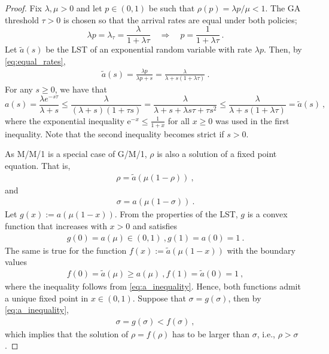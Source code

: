 \documentclass[10pt,a4paper]{amsart}
\def\e{\mathrm{e}}
\begin{document}
\begin{proof}
Fix $\lambda,\mu>0$ and let $p\in(0,1)$ be such that $\rho(p)=\lambda p/\mu<1$. The GA threshold $\tau> 0$ is chosen so that the arrival rates are equal under both policies;
\begin{equation}\label{eq:equal_rates}
    \lambda p=\lambda_\tau=\frac{\lambda}{1+\lambda\tau}\quad\Longrightarrow\quad
p=\frac{1}{1+\lambda\tau}\ .
\end{equation}
Let $\tilde a(s)$ be the LST of an exponential random variable with rate $\lambda p$. Then, by \eqref{eq:equal_rates},
\begin{align*}
\tilde a(s)=\frac{\lambda p}{\lambda p+s}=\frac{\lambda}{\lambda+s(1+\lambda\tau)} \ .
\end{align*}
For any $s\geq 0$, we have that
\begin{equation}\label{eq:a_inequality}
    a(s)=\frac{\lambda e^{-s\tau}}{\lambda+s}
\leq \frac{\lambda}{(\lambda+s)(1+\tau s)}=\frac{\lambda}{\lambda+s+\lambda s\tau+\tau s^2}
\leq \frac{\lambda}{\lambda+s(1+\lambda\tau)}= \tilde a(s)\ ,
\end{equation}
where the exponential inequality $\e^{-x}\leq \frac{1}{1+x}$ for all $x\geq 0$ was used in the first inequality. Note that the second inequality becomes strict if $s>0$.

As M/M/1 is a special case of G/M/1, $\rho$ is also a solution of a fixed point equation. That is,
\begin{align*}
    \rho=\tilde{a}(\mu(1-\rho))\ ,
\end{align*}
and 
\begin{align*}
    \sigma=a(\mu(1-\sigma))\ .
\end{align*}
Let $g(x):=a(\mu(1-x))$. From the properties of the LST, $g$ is a convex function that increases with $x>0$ and satisfies
\begin{align*}
    g(0)=a(\mu)\in(0,1)\  , g(1)=a(0)=1\ .
\end{align*}
The same is true for the function $f(x):=\tilde{a}(\mu(1-x))$ with the boundary values
\begin{align*}
    f(0)=\tilde{a}(\mu)\geq a(\mu)\  , f(1)=\tilde{a}(0)=1\ ,
\end{align*}
where the inequality follows from \eqref{eq:a_inequality}.
Hence, both functions admit a unique fixed point in $x\in(0,1)$. Suppose that $\sigma=g(\sigma)$, then by \eqref{eq:a_inequality},
\begin{align*}
    \sigma=g(\sigma)<f(\sigma)\ ,
\end{align*}
which implies that the solution of $\rho=f(\rho)$ has to be larger than $\sigma$, i.e., $\rho>\sigma$. 
\end{proof}
\end{document}
